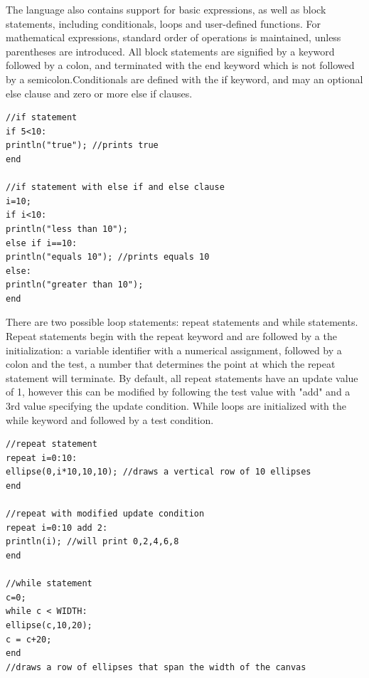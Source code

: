 The  language also contains support for basic expressions, as well as block statements, including conditionals, loops and user-defined functions. For mathematical expressions, standard order of operations is maintained, unless parentheses are introduced. All block statements are signified by a keyword followed by a colon, and terminated with the end keyword which is not followed by a semicolon.Conditionals are defined with the if keyword, and may an optional else clause and  zero or more else if clauses. %

\begin{center}
\begin{lstlisting}
//if statement 
if 5<10:
println("true"); //prints true
end

//if statement with else if and else clause
i=10;
if i<10:
println("less than 10");
else if i==10:
println("equals 10"); //prints equals 10
else:
println("greater than 10");
end
\end{lstlisting}
\end{center}

There are two possible loop statements: repeat statements and while statements. Repeat statements begin with the repeat keyword and are followed by a the initialization: a variable identifier with a numerical assignment, followed by a colon and the test, a number that determines the point at which the repeat statement will terminate. By default, all repeat statements have an update value of 1, however this can be modified by following the test value with "add" and a 3rd value specifying the update condition. While loops are initialized with the while keyword and followed by a test condition.%

\begin{center}
\begin{lstlisting}
//repeat statement
repeat i=0:10:
ellipse(0,i*10,10,10); //draws a vertical row of 10 ellipses
end

//repeat with modified update condition
repeat i=0:10 add 2:
println(i); //will print 0,2,4,6,8
end

//while statement
c=0;
while c < WIDTH:
ellipse(c,10,20);
c = c+20;
end
//draws a row of ellipses that span the width of the canvas
\end{lstlisting}
\end{center}

